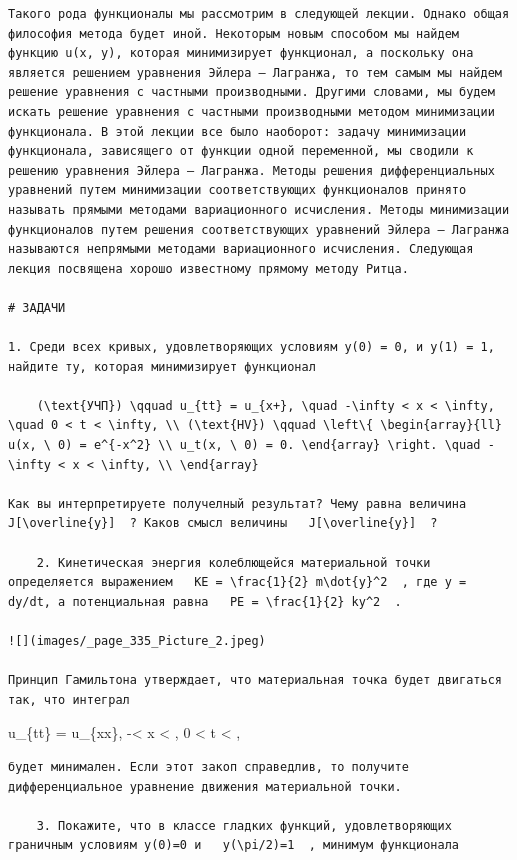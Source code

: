 \documentclass[
  ukrainian,
]{article}
\begin{document}
\begin{verbatim}
Такого рода функционалы мы рассмотрим в следующей лекции. Однако общая философия метода будет иной. Некоторым новым способом мы найдем функцию u(x, y), которая минимизирует функционал, а поскольку она является решением уравнения Эйлера — Лагранжа, то тем самым мы найдем решение уравнения с частными производными. Другими словами, мы будем искать решение уравнения с частными производными методом минимизации функционала. В этой лекции все было наоборот: задачу минимизации функционала, зависящего от функции одной переменной, мы сводили к решению уравнения Эйлера — Лагранжа. Методы решения дифференциальных уравнений путем минимизации соответствующих функционалов принято называть прямыми методами вариационного исчисления. Методы минимизации функционалов путем решения соответствующих уравнений Эйлера — Лагранжа называются непрямыми методами вариационного исчисления. Следующая лекция посвящена хорошо известному прямому методу Ритца.

# ЗАДАЧИ

1. Среди всех кривых, удовлетворяющих условиям y(0) = 0, и y(1) = 1, найдите ту, которая минимизирует функционал

    (\text{УЧП}) \qquad u_{tt} = u_{x+}, \quad -\infty < x < \infty, \quad 0 < t < \infty, \\ (\text{HV}) \qquad \left\{ \begin{array}{ll} u(x, \ 0) = e^{-x^2} \\ u_t(x, \ 0) = 0. \end{array} \right. \quad -\infty < x < \infty, \\ \end{array}

Как вы интерпретируете получелный результат? Чему равна величина   J[\overline{y}]  ? Каков смысл величины   J[\overline{y}]  ?

    2. Кинетическая энергия колеблющейся материальной точки определяется выражением   KE = \frac{1}{2} m\dot{y}^2  , где y = dy/dt, а потенциальная равна   PE = \frac{1}{2} ky^2  .

![](images/_page_335_Picture_2.jpeg)

Принцип Гамильтона утверждает, что материальная точка будет двигаться так, что интеграл
\end{verbatim}

u\_\{tt\} = u\_\{xx\}, -\infty \textless{} x \textless{} \infty, 0
\textless{} t \textless{} \infty,

\begin{verbatim}
будет минимален. Если этот закоп справедлив, то получите дифференциальное уравнение движения материальной точки.

    3. Покажите, что в классе гладких функций, удовлетворяющих граничным условиям y(0)=0 и   y(\pi/2)=1  , минимум функционала
\end{verbatim}
\end{document}
